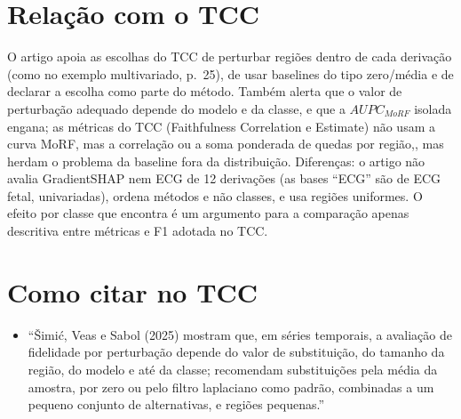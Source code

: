 \documentclass[11pt,a4paper]{article}
\begin{document}
\section{Relação com o TCC}
O artigo apoia as escolhas do TCC de perturbar regiões dentro de cada derivação (como no exemplo multivariado, p.~25), de usar baselines do tipo zero/média e de declarar a escolha como parte do método. Também alerta que o valor de perturbação adequado depende do modelo e da classe, e que a $AUPC_{MoRF}$ isolada engana; as métricas do TCC (Faithfulness Correlation e Estimate) não usam a curva MoRF, mas a correlação ou a soma ponderada de quedas por região,, mas herdam o problema da baseline fora da distribuição. Diferenças: o artigo não avalia GradientSHAP nem ECG de 12 derivações (as bases ``ECG'' são de ECG fetal, univariadas), ordena métodos e não classes, e usa regiões uniformes. O efeito por classe que encontra é um argumento para a comparação apenas descritiva entre métricas e F1 adotada no TCC.

\section{Como citar no TCC}
\begin{itemize}
\item ``Šimić, Veas e Sabol (2025) mostram que, em séries temporais, a avaliação de fidelidade por perturbação depende do valor de substituição, do tamanho da região, do modelo e até da classe; recomendam substituições pela média da amostra, por zero ou pelo filtro laplaciano como padrão, combinadas a um pequeno conjunto de alternativas, e regiões pequenas.''
\end{itemize}
\end{document}
